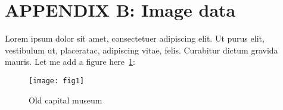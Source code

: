 \renewcommand{\hbAppendixPrefix}{B}
\renewcommand{\thefigure}{\hbAppendixPrefix.\arabic{figure}}
\setcounter{figure}{0}
\renewcommand{\thetable}{\hbAppendixPrefix.\arabic{table}} 
\setcounter{table}{0}

\section{APPENDIX \hbAppendixPrefix: Image data}

Lorem ipsum dolor sit amet, consectetuer adipiscing elit.  Ut purus elit, vestibulum ut, placeratac,  adipiscing vitae,  felis.   Curabitur dictum gravida mauris.
Let me add a figure here~\cref{fig:1}:

\begin{figure}[h]
    \centering
    \captionsetup{width=0.7\linewidth} %
    \caption{Old capital museum}
    \texttt{[image: fig1]}
    \label{fig:1}
\end{figure}
